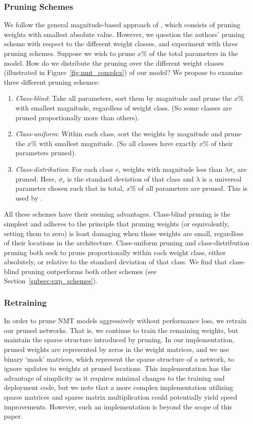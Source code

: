\subsubsection{Pruning Schemes}
\label{subsubsec:approach_schemes}
We follow the general magnitude-based approach of \cite{han2015learning}, which consists of pruning weights with smallest absolute value. However, we question the authors' pruning scheme with respect to the different weight classes, and experiment with three pruning schemes.
Suppose we wish to prune $x$\% of the total parameters in the model. 
How do we distribute the pruning over the different weight classes (illustrated in Figure~\ref{fig:nmt_complex}) of our model? 
We propose to examine three different pruning schemes:
\begin{enumerate}
\item \textit{Class-blind}: 
Take all parameters, sort them by magnitude and prune the $x$\% with smallest magnitude, regardless of weight class.
(So some classes are pruned proportionally more than others).
\item \textit{Class-uniform}: 
Within each class, sort the weights by magnitude and prune the $x$\% with smallest magnitude.
(So all classes have exactly $x$\% of their parameters pruned).
\item \textit{Class-distribution}: 
 For each class $c$, weights with magnitude less than $\lambda \sigma_c$ are
 pruned. Here, $\sigma_c$ is the standard deviation of that class and $\lambda$ is a universal parameter chosen such that in total, $x\%$ of all parameters are pruned.
This is used by \cite{han2015learning}.
\end{enumerate}
All these schemes have their seeming advantages.
Class-blind pruning is the simplest and adheres to the principle that pruning
weights (or equivalently, setting them to zero) is least damaging when
those weights are small, regardless of their locations in the architecture.
Class-uniform pruning and class-distribution pruning both seek to prune
proportionally within each weight class, either absolutely, or relative to the
standard deviation of that class.
We find that class-blind pruning outperforms both other schemes (see Section~\ref{subsec:exp_schemes}).

\subsubsection{Retraining}
\label{subsubsec:approach_retraining}
In order to prune NMT models aggressively without performance loss, we retrain our pruned networks. 
That is, we continue to train the remaining weights, but maintain the sparse structure introduced by pruning.
In our implementation, pruned weights are represented by zeros in the weight matrices, 
and we use binary `mask' matrices, which represent the sparse structure of a network, 
to ignore updates to weights at pruned locations.
This implementation has the advantage of simplicity as it requires minimal changes to the training and deployment code, 
but we note that a more complex implementation utilizing sparse matrices and sparse matrix multiplication could potentially yield speed improvements.
However, such an implementation is beyond the scope of this paper.


